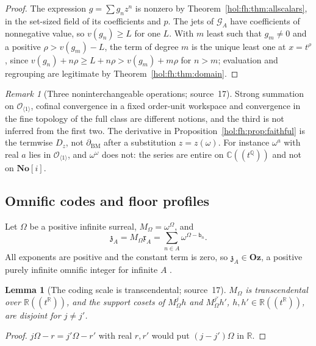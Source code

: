 \documentclass[11pt]{article}
\numberwithin{equation}{section}
\newtheorem{lemma}[theorem]{Lemma}
\theoremstyle{definition}
\theoremstyle{remark}
\newtheorem{remark}[theorem]{Remark}
\newcommand{\C}{\mathbb C}
\newcommand{\R}{\mathbb R}
\newcommand{\Q}{\mathbb Q}
\newcommand{\No}{\mathbf{No}}
\newcommand{\Oz}{\mathbf{Oz}}
\begin{document}
\begin{proof}
The expression $g=\sum g_nz^n$ is nonzero by
Theorem~\ref{hol:fh:thm:allscalars}, in the set-sized field of its coefficients
and $p$. The jets of $\mathcal G_A$ have coefficients of nonnegative value, so
$v(g_n)\ge L$ for one $L$. With $m$ least such that $g_m\ne0$ and a positive
$\rho>v(g_m)-L$, the term of degree $m$ is the unique least one at $x=t^\rho$,
since $v(g_n)+n\rho\ge L+n\rho>v(g_m)+m\rho$ for $n>m$; evaluation and
regrouping are legitimate by Theorem~\ref{hol:fh:thm:domain}.
\end{proof}

\begin{remark}[Three noninterchangeable operations; source~17]
\label{hol:fh:rem:three}
Strong summation on $\mathcal O_{\langle1\rangle}$, cofinal convergence in a
fixed order-unit workspace and convergence in the fine topology of the full
class are different notions, and the third is not inferred from the first
two. The derivative in Proposition~\ref{hol:fh:prop:faithful} is the termwise
$D_z$, not $\partial_{\mathrm{BM}}$ after a substitution $z=z(\omega)$. For
instance $\omega^a$ with real $a$ lies in $\mathcal O_{\langle1\rangle}$, and
$\omega^\omega$ does not: the series are entire on $\C((t^\Q))$ and not on
$\No[i]$.
\end{remark}

\subsection{Omnific codes and floor profiles}\label{hol:fh:sub:omnific}

Let $\Omega$ be a positive infinite surreal, $M_\Omega=\omega^\Omega$, and
\[
 \mathfrak z_A=M_\Omega\mathfrak x_A=\sum_{n\in A}\omega^{\Omega-\mathsf b_n}.
\]
All exponents are positive and the constant term is zero, so
$\mathfrak z_A\in\Oz$, a positive purely infinite omnific integer for infinite
$A$ \cite{repoodg}.

\begin{lemma}[The coding scale is transcendental; source~17]
\label{hol:fh:lem:scale}
$M_\Omega$ is transcendental over $\R((t^\R))$, and the support cosets of
$M_\Omega^jh$ and $M_\Omega^{j'}h'$, $h,h'\in\R((t^\R))$, are disjoint for
$j\ne j'$.
\end{lemma}

\begin{proof}
$j\Omega-r=j'\Omega-r'$ with real $r,r'$ would put $(j-j')\Omega$ in $\R$.
\end{proof}
\end{document}
